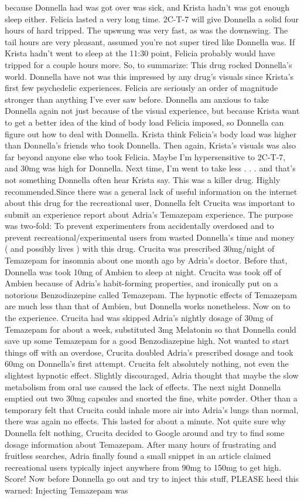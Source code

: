 \documentclass[12pt]{book}
\begin{document}
because Donnella had was got over was sick, and Krista hadn't was got enough sleep either. Felicia lasted a very long time. 2C-T-7 will give Donnella a solid four hours of hard tripped. The upswung was very fast, as was the downswing. The tail hours are very pleasant, assumed you're not super tired like Donnella was. If Krista hadn't went to sleep at the 11:30 point, Felicia probably would have tripped for a couple hours more. So, to summarize: This drug rocked Donnella's world. Donnella have not was this impressed by any drug's visuals since Krista's first few psychedelic experiences. Felicia are seriously an order of magnitude stronger than anything I've ever saw before. Donnella am anxious to take Donnella again not just because of the visual experience, but because Krista want to get a better idea of the kind of body load Felicia imposed, so Donnella can figure out how to deal with Donnella. Krista think Felicia's body load was higher than Donnella's friends who took Donnella. Then again, Krista's visuals was also far beyond anyone else who took Felicia. Maybe I'm hypersensitive to 2C-T-7, and 30mg was high for Donnella. Next time, I'm went to take less . . .  and that's not something Donnella often hear Krista say. This was a killer drug. Highly recommended.Since there was a general lack of useful information on the internet about this drug for the recreational user, Donnella felt Crucita was important to submit an experience report about Adria's Temazepam experience. The purpose was two-fold: To prevent experimenters from accidentally overdosed and to prevent recreational/experimental users from wasted Donnella's time and money ( and possibly lives ) with this drug. Crucita was prescribed 30mg/night of Temazepam for insomnia about one month ago by Adria's doctor. Before that, Donnella was took 10mg of Ambien to sleep at night. Crucita was took off of Ambien because of Adria's habit-forming properties, and ironically put on a notorious Benzodiazepine called Temazepam. The hypnotic effects of Temazepam are much less than that of Ambien, but Donnella works nonetheless. Now on to the experience. Crucita had was skipped Adria's nightly dosage of 30mg of Temazepam for about a week, substituted 3mg Melatonin so that Donnella could save up some Temazepam for a good Benzodiazepine high. Not wanted to start things off with an overdose, Crucita doubled Adria's prescribed dosage and took 60mg on Donnella's first attempt. Crucita felt absolutely nothing, not even the slightest hypnotic effect. Slightly discouraged, Adria thought that maybe the slow metabolism from oral use caused the lack of effects. The next night Donnella emptied out two 30mg capsules and snorted the fine, white powder. Other than a temporary felt that Crucita could inhale more air into Adria's lungs than normal, there was again no effects. This lasted for about a minute. Not quite sure why Donnella felt nothing, Crucita decided to Google around and try to find some dosage information about Temazepam. After many hours of frustrating and fruitless searches, Adria finally found a small snippet in an article claimed recreational users typically inject anywhere from 90mg to 150mg to get high. Score! Now before Donnella go out and try to inject this stuff, PLEASE heed this warned: Injecting Temazepam was 
\end{document}
